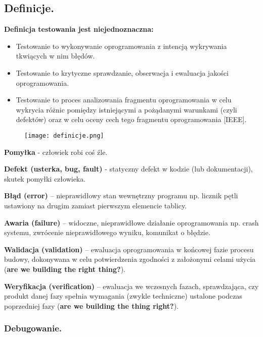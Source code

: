 \documentclass[../main.tex]{subfiles}
\begin{document}
    \subsection{Definicje.}

    \textbf{Definicja testowania jest niejednoznaczna:}
    \begin{itemize}
        \item Testowanie to wykonywanie oprogramowania z intencją wykrywania
        tkwiących w nim błędów.
        \item Testowanie to krytyczne sprawdzanie, obserwacja i ewaluacja jakości
        oprogramowania.
        \item Testowanie to proces analizowania fragmentu oprogramowania w celu
        wykrycia różnic pomiędzy istniejącymi a pożądanymi warunkami (czyli
        defektów) oraz w celu oceny cech tego fragmentu oprogramowania [IEEE].
    \end{itemize}

    \begin{figure}[H]
        \texttt{[image: definicje.png]}
    \end{figure}

    \textbf{Pomyłka} - człowiek robi coś źle.

    \textbf{Defekt (usterka, bug, fault)} - statyczny defekt w kodzie (lub dokumentacji), skutek pomyłki człowieka.

    \textbf{Błąd (error)} – nieprawidłowy stan wewnętrzny programu
    np. licznik pętli ustawiony na drugim zamiast pierwszym elemencie tablicy.

    \textbf{Awaria (failure)} – widoczne, nieprawidłowe działanie oprogramowania
    np. crash systemu, zwrócenie nieprawidłowego wyniku, komunikat o błędzie.

    \textbf{Walidacja (validation)} – ewaluacja oprogramowania w
    końcowej fazie procesu budowy, dokonywana w celu
    potwierdzenia zgodności z założonymi celami użycia (\textbf{are we building the right thing?}).


    \textbf{Weryfikacja (verification)} – ewaluacja we wczesnych fazach,
    sprawdzająca, czy produkt danej fazy spełnia wymagania
    (zwykle techniczne) ustalone podczas poprzedniej fazy (\textbf{are we building the thing right?}).

    \subsubsection{Debugowanie.}
\end{document}
